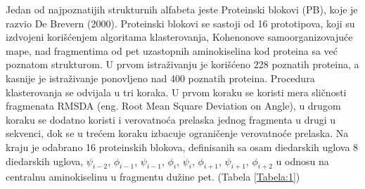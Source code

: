 \documentclass[a4paper,12pt]{article}
\begin{document}
Jedan od najpoznatijih strukturnih alfabeta jeste Proteinski blokovi (PB), koje je razvio De Brevern (2000). Proteinski blokovi se sastoji od 16 prototipova, koji su izdvojeni korišćenjem algoritama klasterovanja, Kohenonove samoorganizovajuće mape, nad fragmentima od pet uzastopnih aminokiselina kod proteina sa već poznatom strukturom. U prvom istraživanju je korišćeno 228 poznatih proteina, a kasnije je istraživanje ponovljeno nad 400 poznatih proteina. Procedura klasterovanja se odvijala u tri koraka. U prvom koraku se koristi mera sličnosti fragmenata RMSDA (eng. Root Mean Square Deviation on Angle), u drugom koraku se dodatno koristi i verovatnoća prelaska jednog fragmenta u drugi u sekvenci, dok se u trećem koraku izbacuje ograničenje verovatnoće prelaska. Na kraju je odabrano 16 proteinskih blokova, definisanih sa osam diedarskih uglova 8 diedarskih uglova, $\psi_{i-2}$, $\phi_{i-1}$, $\psi_{i-1}$, $\phi_i$, $\psi_i$, $\phi_{i+1}$, $\psi_{i+1}$, $\phi_{i+2}$ u odnosu na centralnu aminokiselinu u fragmentu dužine pet. (Tabela \ref{Tabela:1})
\\
\end{document}
